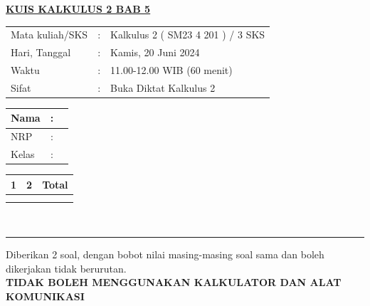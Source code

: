 \documentclass[10pt,openany,a4paper]{article}
\theoremstyle{definition}
\theoremstyle{definition}
\theoremstyle{plain}
\begin{document}
    \begin{center}
	{\underline{\textbf{\MakeUppercase{KUIS KALKULUS 2 BAB 5}}}}
    \end{center}

    \begin{center}
	\begin{tabular}{lcl}
		Mata kuliah/SKS & : & Kalkulus 2 ( SM23 4 201 ) / 3 SKS\\
		Hari, Tanggal & : & Kamis, 20 Juni 2024\\
		Waktu & : & 11.00-12.00 WIB (60 menit)\\
		Sifat & : & Buka Diktat Kalkulus 2\\
	\end{tabular}
    \end{center}
\begin{minipage}{.45\linewidth}
    \begin{flushleft}
      \begin{tabular}{|lcl|}
    \hline
       Nama  & : &  \qquad \qquad \qquad \qquad \qquad\qquad\qquad \\
       \hline
       NRP & :  & \\
       \hline
       Kelas & : &\\
       \hline
    \end{tabular}
    \end{flushleft}
  \end{minipage}
  \hfill
  \begin{minipage}{.45\linewidth}
    \begin{flushright}
     \begin{tabular}{|c|c|c|}
      \hline
       \large{1}& \large{2} & \large{Total}\\
       \hline
       \qquad \qquad\qquad &  \qquad\qquad\qquad& \qquad\qquad\qquad \\
        \qquad \qquad\qquad & \qquad\qquad\qquad& \qquad\qquad\qquad \\
       \hline
    \end{tabular}
    \end{flushright} 
  \end{minipage}\\
    
    \noindent\rule{\textwidth}{2.pt}
	
    \noindent Diberikan 2 soal, dengan bobot nilai masing-masing soal sama dan boleh dikerjakan tidak berurutan.\\
    \textbf{\MakeUppercase{Tidak boleh menggunakan kalkulator dan alat komunikasi}}
	
\end{document}
